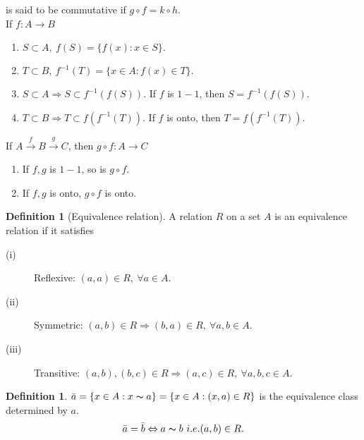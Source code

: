 \documentclass[leqno,DIV=calc,paper=a4,fontsize=11pt]{article}
\theoremstyle{definition}
\newtheorem{defn}[thm]{Definition}
\theoremstyle{plain}
\theoremstyle{remark}
\begin{document}
\begin{center}
\end{center}
is said to be commutative if $g\circ f=k\circ h$.\\
If $f:A\to B$
\begin{enumerate}
  \item $S\subset A,\ f(S)=\{f(x):x\in S\}.$
  \item $T\subset B,\ f^{-1}(T)=\{x\in A: f(x)\in T\}.$
  \item $S\subset A\Rightarrow S\subset f^{-1}(f(S))$. If $f$ is $1-1$, then $S=f^{-1}(f(S))$.
  \item $T\subset B \Rightarrow  T\subset f(f^{-1}(T))$. If $f$ is onto, then $T=f(f^{-1}(T))$.
\end{enumerate}
If $A\xrightarrow{f} B\xrightarrow{g} C$, then $g\circ f:A\to C$
\begin{enumerate}
  \item If $f,g$ is $1-1$, so is $g\circ f$.
  \item If $f,g$ is onto, $g\circ f$ is onto.
\end{enumerate}

\begin{defn}[Equivalence relation]
A relation $R$ on a set $A$ is an equivalence relation if it satisfies
\begin{description}
  \item[(i)] Reflexive: $(a,a)\in R,\ \forall a\in A$.
  \item[(ii)] Symmetric: $(a,b)\in R\Rightarrow (b,a)\in R,\ \forall a,b\in A$.
  \item[(iii)] Transitive: $(a,b),(b,c)\in R\Rightarrow (a,c)\in R,\ \forall a,b,c\in A$.
\end{description}
\end{defn}
\begin{defn}
$\bar{a}=\{x\in A:x\thicksim a\}=\{x\in A:(x,a)\in R\}$ is the equivalence class determined by $a$.
$$\bar{a}=\bar{b}\Leftrightarrow a\thicksim b\ i.e. (a,b)\in R.$$
\end{defn}
\end{document}
